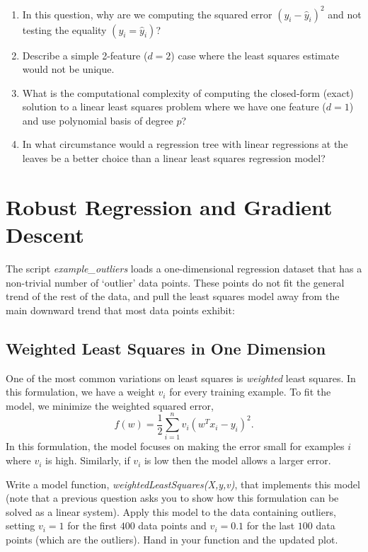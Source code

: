 \documentclass{article}
\def\blu#1{{\color{blu}#1}}
\newcommand{\centerfig}[2]{\begin{center}\texttt{[image: a2f/\#2]}\end{center}}
\def\enum#1{\begin{enumerate}#1\end{enumerate}}
\begin{document}
\blu{
\enum{
\item In this question, why are we computing the squared error $(y_i -  \hat{y}_i)^2$ and not testing the equality $(y_i = \hat{y}_i)$?
\item Describe a simple 2-feature ($d=2$) case where the least squares estimate would not be unique.
\item What is the computational complexity of computing the closed-form (exact) solution to a linear least squares problem where we have one feature ($d = 1$) and use polynomial basis of degree $p$?
\item  In what circumstance would a regression tree with linear regressions at the leaves be a better choice than a linear least squares regression model?
}}


\section{Robust Regression and Gradient Descent}

The script \emph{example\_outliers} loads a one-dimensional regression dataset that has a non-trivial number of `outlier' data points. These points do not fit the general trend of the rest of the data, and pull the least squares model away from the main downward trend that most data points exhibit:




\subsection{Weighted Least Squares in One Dimension}

One of the most common variations on least squares is \emph{weighted} least squares. In this formulation, we have a weight $v_i$ for every training example. To fit the model, we minimize the weighted squared error,
\[
f(w) =  \frac{1}{2}\sum_{i=1}^n v_i(w^Tx_i - y_i)^2.
\]
In this formulation, the model focuses on making the error small for examples $i$ where $v_i$ is high. Similarly, if $v_i$ is low then the model allows a larger error.

Write a model function, \emph{weightedLeastSquares(X,y,v)}, that implements this model (note that a previous question asks you to show how this formulation can be solved as a linear system).
Apply this model to the data containing outliers, setting $v_i = 1$ for the first $400$ data points and $v_i = 0.1$ for the last $100$ data points (which are the outliers). \blu{Hand in your function and the updated plot}.
\end{document}
